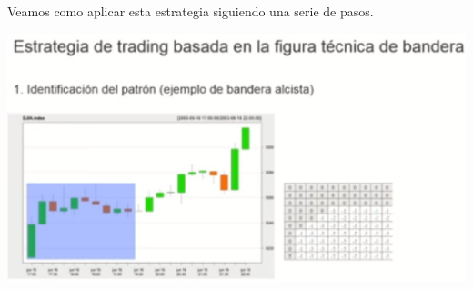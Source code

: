 Veamos como aplicar esta estrategia siguiendo una serie de pasos.

\begin{center}
    \includegraphics[scale=.45]{images/mod03-12.png}
\end{center}

